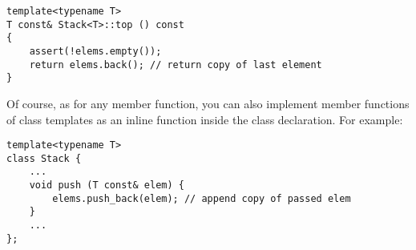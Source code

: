\begin{lstlisting}[style=styleCXX]
template<typename T>
T const& Stack<T>::top () const
{
	assert(!elems.empty());
	return elems.back(); // return copy of last element
}
\end{lstlisting}

Of course, as for any member function, you can also implement member functions of class templates as an inline function inside the class declaration. For example:

\begin{lstlisting}[style=styleCXX]
template<typename T>
class Stack {
	...
	void push (T const& elem) {
		elems.push_back(elem); // append copy of passed elem
	}
	...
};
\end{lstlisting}






